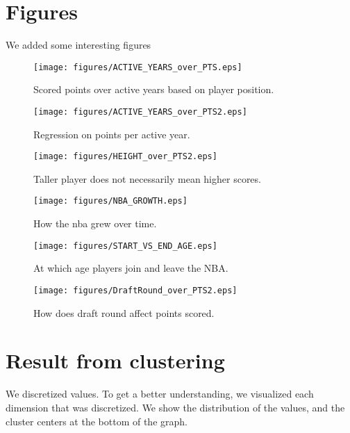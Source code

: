 \documentclass{article}
\begin{document}
\section{Figures}
We added some interesting figures

\begin{figure}[h]
    \centering
    \texttt{[image: figures/ACTIVE\_YEARS\_over\_PTS.eps]}
    \caption{Scored points over active years based on player position.}
\end{figure}

\begin{figure}[h]
    \centering
    \texttt{[image: figures/ACTIVE\_YEARS\_over\_PTS2.eps]}
    \caption{Regression on points per active year.}
\end{figure}

\begin{figure}[h]
    \centering
    \texttt{[image: figures/HEIGHT\_over\_PTS2.eps]}
    \caption{Taller player does not necessarily mean higher scores.}
\end{figure}

\begin{figure}[h]
    \centering
    \texttt{[image: figures/NBA\_GROWTH.eps]}
    \caption{How the nba grew over time.}
\end{figure}

\begin{figure}[h]
    \centering
    \texttt{[image: figures/START\_VS\_END\_AGE.eps]}
    \caption{At which age players join and leave the NBA.}
\end{figure}

\begin{figure}[h]
    \centering
    \texttt{[image: figures/DraftRound\_over\_PTS2.eps]}
    \caption{How does draft round affect points scored.}
\end{figure}

\clearpage

\section{Result from clustering}

We discretized values.
To get a better understanding, we visualized each dimension that was discretized.
We show the distribution of the values, and the cluster centers at the bottom of the graph.
\end{document}

